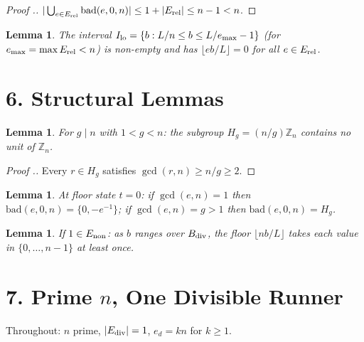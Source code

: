 \documentclass[11pt,a4paper]{article}
\theoremstyle{plain}
\newtheorem{lemma}[theorem]{Lemma}
\theoremstyle{definition}
\theoremstyle{remark}
\begin{document}
\begin{proof}[Proof .]
$|\bigcup_{e \in E_{\rm rel}} \mathrm{bad}(e,0,n)| \leq 1 + |E_{\rm rel}| \leq n-1 < n$.
\end{proof}


\begin{lemma}
The interval $I_{\rm lo} = \{b : L/n \leq b \leq L/e_{\max}-1\}$ (for $e_{\max} = \max E_{\rm rel} < n$) is non-empty and has $\lfloor eb/L \rfloor = 0$ for all $e \in E_{\rm rel}$.

\end{lemma}


\medskip



\section{6. Structural Lemmas}



\begin{lemma}
For $g \mid n$ with $1 < g < n$: the subgroup $H_g = (n/g)\mathbb{Z}_n$ contains no unit of $\mathbb{Z}_n$.

\end{lemma}

\begin{proof}[Proof .]
Every $r \in H_g$ satisfies $\gcd(r,n) \geq n/g \geq 2$.
\end{proof}


\begin{lemma}
At floor state $t=0$: if $\gcd(e,n)=1$ then $\mathrm{bad}(e,0,n) = \{0, -e^{-1}\}$; if $\gcd(e,n)=g>1$ then $\mathrm{bad}(e,0,n) = H_g$.

\end{lemma}


\begin{lemma}
If $1 \in E_{\rm non}$: as $b$ ranges over $B_{\rm div}$, the floor $\lfloor nb/L \rfloor$ takes each value in $\{0,\ldots,n-1\}$ at least once.

\end{lemma}


\medskip



\section{7. Prime $n$, One Divisible Runner}


Throughout: $n$ prime, $|E_{\rm div}|=1$, $e_d = kn$ for $k \geq 1$.
\end{document}
